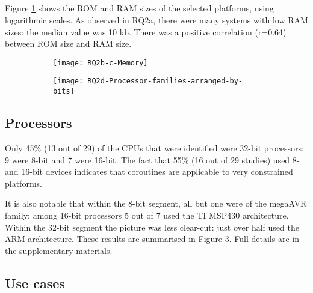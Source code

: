 \DIFaddbegin \subsection{}

\DIFaddend Figure \ref{fig:rq2bc} shows the ROM and RAM sizes of the selected platforms, using logarithmic scales. As observed in RQ2a, there were many systems with low RAM sizes: the median value was 10 kb. There was a positive correlation (r=0.64) between ROM size and RAM size.

\DIFaddbegin \begin{figure}[h]
	\centering
	\begin{subfigure}[h]{0.46\textwidth}
		\centering
		\texttt{[image: RQ2b-c-Memory]}
		\caption{}
		\label{fig:rq2bc}
	\end{subfigure}
	\begin{subfigure}[h]{0.46\textwidth}
		\centering
		\texttt{[image: RQ2d-Processor-families-arranged-by-bits]}
		\caption{}
		\label{fig:rq2d}
	\end{subfigure}
	\caption{}
\end{figure}

\DIFaddend \subsection{Processors}

Only 45\% (13 out of 29) of the CPUs that were identified were 32-bit processors: 9 were 8-bit and 7 were 16-bit. The fact that 55\% (16 out of 29 studies) used 8- and 16-bit devices indicates that coroutines are applicable to very constrained platforms.

It is also notable that within the 8-bit segment, all but one were of the megaAVR family; among 16-bit processors 5 out of 7 used the TI MSP430 architecture. Within the 32-bit segment the picture was less clear-cut: just over half used the ARM architecture. These results are summarised in Figure \ref{fig:rq2d}. Full details are in the supplementary materials.

\subsection{Use cases}

